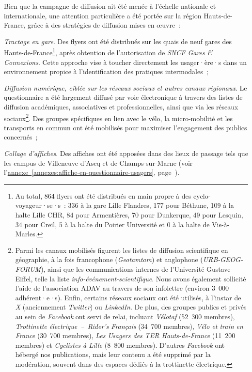 \begin{refsegment}
Bien que la campagne de diffusion ait été menée à l’échelle nationale et internationale, une attention particulière a été portée sur la région Hauts-de-France, grâce à des stratégies de diffusion mises en œuvre~: 
\begin{customitemize}
    \item \textsl{Tractage en gare}. Des flyers ont été distribués sur les quais de neuf gares des Hauts-de-France\footnote{
        Au total, 864 flyers ont été distribués en main propre à des cyclo-voyageur·se·s~: 336 à la gare Lille Flandres, 177 pour Béthune, 109 à la halte Lille CHR, 84 pour Armentières, 70 pour Dunkerque, 49 pour Lesquin, 34 pour Creil, 5 à la halte du Poirier Université et 0 à la halte de Vis-à-Marles.
    }, après obtention de l’autorisation de \textsl{SNCF Gares \& Connexions}. Cette approche vise à toucher directement les usager·ère·s dans un environnement propice à l’identification des pratiques intermodales~;
    \item \textsl{Diffusion numérique, ciblée sur les réseaux sociaux et autres canaux régionaux}. Le questionnaire a été largement diffusé par voie électronique à travers des listes de diffusion académiques, associatives et professionnelles, ainsi que via les réseaux sociaux\footnote{
        Parmi les canaux mobilisés figurent les listes de diffusion scientifique en géographie, à la fois francophone (\textsl{Geotamtam}) et anglophone (\textsl{URB-GEOG-FORUM}), ainsi que les communications internes de l'Université Gustave Eiffel, telle la liste \textsl{info-événement-scientifique}. Nous avons également sollicité l'aide de l'association \acrfull{ADAV} au travers de son infolettre (environ 3~000 adhérent·e·s). Enfin, certains réseaux sociaux ont été utilisés, à l'instar de \textsl{X} (anciennement \textsl{Twitter}) ou \textsl{LinkedIn}. De plus, des groupes publics et privés au sein de \textsl{Facebook} ont servi de relai, incluant \textsl{Vélotaf} (52~300 membres), \textsl{Trottinette électrique~–~Rider's Français} (34~700 membres), \textsl{Vélo et train en France} (30~700 membres), \textsl{Les Usagers des TER Hauts-de-France} (11~200 membres) et \textsl{Cyclistes à Lille} (8~800 membres). D'autres  \textsl{Facebook} ont hébergé nos publications, mais leur contenu a été supprimé par la modération, souvent dans des espaces dédiés à la trottinette électrique.
    }. Des groupes spécifiques en lien avec le vélo, la micro-mobilité et les transports en commun ont été mobilisés pour maximiser l’engagement des publics concernés~;
    \item \textsl{Collage d'affiches}. Des affiches ont été apposées dans des lieux de passage tels que les campus de Villeneuve d’Ascq et de Champs-sur-Marne (voir l'\hyperref[annexes:affiche-en-questionnaire-usagers]{annexe~\ref{annexes:affiche-en-questionnaire-usagers}}, page~\pageref{annexes:affiche-en-questionnaire-usagers}).  
\end{customitemize}%


\end{refsegment}
